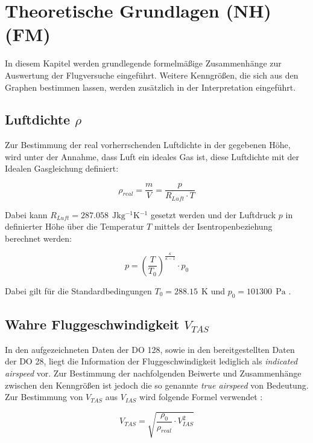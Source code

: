 \chapter{Theoretische Grundlagen (NH)(FM)}
\label{c:TheoGrund}

In diesem Kapitel werden grundlegende formelmäßige Zusammenhänge zur Auswertung der Flugversuche eingeführt. Weitere Kenngrößen, die sich aus den Graphen bestimmen lassen, werden zusätzlich in der Interpretation eingeführt.

\section{Luftdichte $\rho$}

Zur Bestimmung der real vorherrschenden Luftdichte in der gegebenen Höhe, wird unter der Annahme, dass Luft ein ideales Gas ist, diese Luftdichte mit der Idealen Gasgleichung definiert:

\begin{equation}
\rho_{real}=\frac{m}{V}=\frac{p}{R_{Luft} \cdot T}
\end{equation}

Dabei kann $R_{Luft}=\SI{287,058 }{\ \joule\kilogram^{-1}\kelvin^{-1}}$ gesetzt werden und der Luftdruck $p$ in definierter Höhe über die Temperatur $T$ mittels der Isentropenbeziehung berechnet werden:

\begin{equation}
p=\left(\frac{T}{T_0}\right)^{\frac{\kappa}{\kappa-1}} \cdot p_0
\end{equation}

Dabei gilt für die Standardbedingungen $T_0=\SI{288,15}{\ \kelvin}$ und $p_0=\SI{101300}{\ \pascal}$ \cite{Skript}\cite{Kurzskript}.

\section{Wahre Fluggeschwindigkeit $V_{TAS}$}

In den aufgezeichneten Daten der DO 128, sowie in den bereitgestellten Daten der DO 28, liegt die Information der Fluggeschwindigkeit lediglich als \textit{indicated airspeed} vor. Zur Bestimmung der nachfolgenden Beiwerte und Zusammenhänge zwischen den Kenngrößen ist jedoch die so genannte \textit{true airspeed} von Bedeutung. Zur Bestimmung von $V_{TAS}$ aus $V_{IAS}$ wird folgende Formel verwendet \cite{Kurzskript}:

\begin{equation}
V_{TAS}=\sqrt{\frac{\rho_0}{\rho_{real}} \cdot V_{IAS}^2}
\end{equation}

